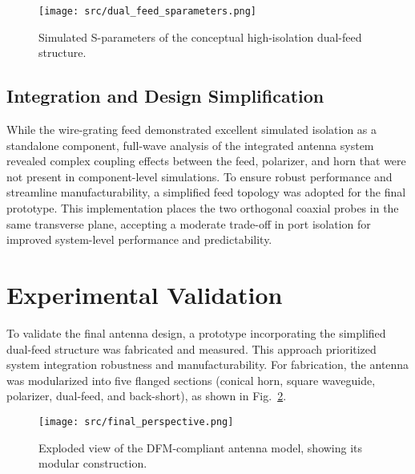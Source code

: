 \documentclass[journal]{IEEEtran}
\begin{document}
\begin{figure}[!ht]
    \centering
    \texttt{[image: src/dual\_feed\_sparameters.png]}
    \caption{\label{fig:dual-feed-sparameters}Simulated S-parameters of the conceptual high-isolation dual-feed structure.}
\end{figure}

\subsection{Integration and Design Simplification}
While the wire-grating feed demonstrated excellent simulated isolation as a standalone component, full-wave analysis of the integrated antenna system revealed complex coupling effects between the feed, polarizer, and horn that were not present in component-level simulations. To ensure robust performance and streamline manufacturability, a simplified feed topology was adopted for the final prototype. This implementation places the two orthogonal coaxial probes in the same transverse plane, accepting a moderate trade-off in port isolation for improved system-level performance and predictability.


\section{Experimental Validation}
\label{sec:experimental-validation}

To validate the final antenna design, a prototype incorporating the simplified dual-feed structure was fabricated and measured. This approach prioritized system integration robustness and manufacturability. For fabrication, the antenna was modularized into five flanged sections (conical horn, square waveguide, polarizer, dual-feed, and back-short), as shown in Fig.~\ref{fig:final-perspective}.

\begin{figure}[!ht]
\centering
\texttt{[image: src/final\_perspective.png]}
\caption{\label{fig:final-perspective}Exploded view of the DFM-compliant antenna model, showing its modular construction.}
\end{figure}
\end{document}
